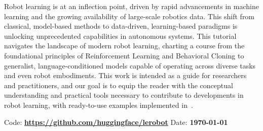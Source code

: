 Robot learning is at an inflection point, driven by rapid advancements in machine learning and the growing availability of large-scale robotics data. 
This shift from classical, model-based methods to data-driven, learning-based paradigms is unlocking unprecedented capabilities in autonomous systems. 
This tutorial navigates the landscape of modern robot learning, charting a course from the foundational principles of Reinforcement Learning and Behavioral Cloning to generalist, language-conditioned models capable of operating across diverse tasks and even robot embodiments.
This work is intended as a guide for researchers and practitioners, and our goal is to equip the reader with the conceptual understanding and practical tools necessary to contribute to developments in robot learning, with ready-to-use examples implemented in~\lerobot.
\newline

Code: \textbf{\url{https://github.com/huggingface/lerobot}}
\newline
Date: \textbf{\today}